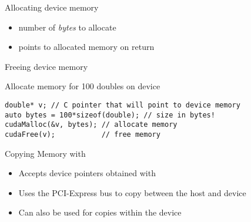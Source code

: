 \documentclass[aspectratio=43]{beamer}
\begin{document}
\begin{frame}[fragile]{}
    \begin{info}{Allocating device memory}
        \centering {}
    \begin{itemize}
        \item {} number of \emph{bytes} to allocate
        \item {} points to allocated memory on return
    \end{itemize}
    \end{info}

    \begin{info}{Freeing device memory}
        \centering {}
    \end{info}

    \begin{code}{Allocate memory for 100 doubles on device}
        \begin{lstlisting}[style=boxcuda]
double* v; // C pointer that will point to device memory
auto bytes = 100*sizeof(double); // size in bytes!
cudaMalloc(&v, bytes); // allocate memory
cudaFree(v);           // free memory
\end{lstlisting}
    \end{code}
\end{frame}

\begin{frame}[fragile]{Copying Memory with }

    \begin{itemize}
        \item Accepts device pointers obtained with 
        \item Uses the PCI-Express bus to copy between the host and device
        \item Can also be used for copies within the device
    \end{itemize}
\end{frame}
\end{document}
